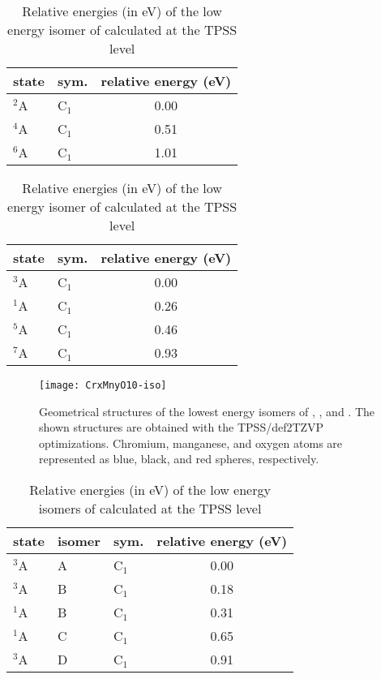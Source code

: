 \begin{table}[]
	\centering
	\caption{Relative energies (in eV) of the low energy isomer of  calculated at the TPSS level}
	\begin{tabular}{@{}llc@{}}
	\toprule
	   state & sym.    & relative energy (eV) \\ \midrule
	$^2$A    & C$_1$   & 0.00                 \\
	$^4$A    & C$_1$   & 0.51                 \\
	$^6$A    & C$_1$   & 1.01                 \\ \bottomrule
	\end{tabular}
\end{table}



\begin{table}[]
	\centering
	\caption{Relative energies (in eV) of the low energy isomer of  calculated at the TPSS level}
	\begin{tabular}{@{}llc@{}}
	\toprule
	state & sym. & relative energy (eV) \\ \midrule
	$^3$A    & C$_1$   & 0.00                 \\
	$^1$A    & C$_1$   & 0.26                 \\
	$^5$A    & C$_1$   & 0.46                 \\
	$^7$A    & C$_1$   & 0.93                 \\ \bottomrule
	\end{tabular}
\end{table}






\begin{figure}
	\centering
	\texttt{[image: CrxMnyO10-iso]}
	\caption{Geometrical structures of the lowest energy isomers of , , and . The shown structures are obtained with the TPSS/def2TZVP optimizations. Chromium, manganese, and oxygen atoms are represented as blue, black, and red spheres, respectively.}
	\label{figs:CrxMnyO10}
\end{figure}


\newpage


\begin{table}[]
	\centering
	\caption{Relative energies (in eV) of the low energy isomers of  calculated at the TPSS level}
	\begin{tabular}{@{}lllc@{}}
	\toprule
	   state & isomer & sym.    & relative energy (eV) \\ \midrule
	$^3$A    & A      & C$_1$   & 0.00                 \\
	$^3$A    & B      & C$_1$   & 0.18                 \\
	$^1$A    & B      & C$_1$   & 0.31                 \\
	$^1$A    & C      & C$_1$   & 0.65                 \\
	$^3$A    & D      & C$_1$   & 0.91                 \\ \bottomrule
	\end{tabular}
\end{table}




